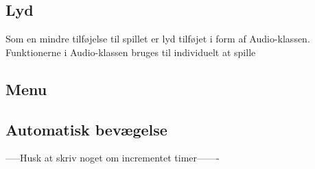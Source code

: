 \documentclass{report}
\begin{document}
\begin{figure}[h]
	\centering
	\graphicspath{ {pics/} }
	\caption{}
	\hspace{0.05\textwidth}
	\hspace{0.05\textwidth}
	\hspace{0.05\textwidth}
\end{figure}

\subsection{Lyd}

Som en mindre tilføjelse til spillet er lyd tilføjet i form af Audio-klassen. Funktionerne i Audio-klassen bruges til individuelt at spille 	


\subsection{Menu}

\subsection{Automatisk bevægelse}
-----Husk at skriv noget om incrementet timer-------
\end{document}
